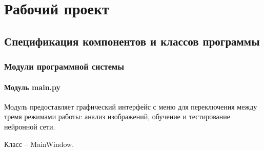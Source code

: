\section{Рабочий проект}

\subsection{Спецификация компонентов и классов программы}

\subsubsection{Модули программной системы}

\paragraph{Модуль main.py}

Модуль предоставляет графический интерфейс с меню для переключения между тремя режимами работы: анализ изображений, обучение и тестирование нейронной сети. 

Класс -- MainWindow.

